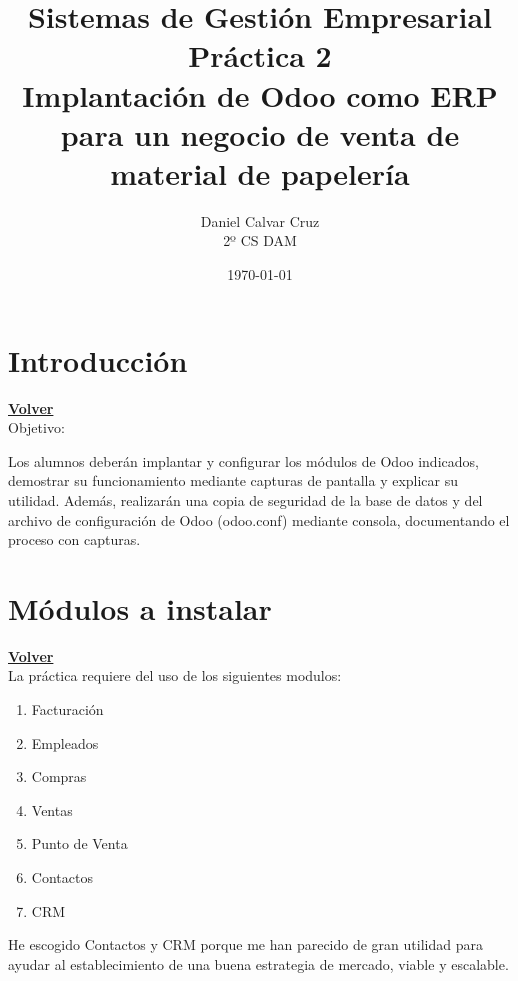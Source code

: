 \documentclass[a4paper,12pt]{article}
\title{
    \vspace{2cm}
    {\Huge\textbf{Sistemas de Gestión Empresarial}}\\[1em]
    {\Large\textbf{Práctica 2}}\\[1em]
    {\Large Implantación de Odoo como ERP para un negocio de venta de material de papelería}
    \vspace{1.5cm}
}
\author{\Large Daniel Calvar Cruz\\[0.5em]\normalsize 2º CS DAM}
\date{\vspace{1cm}\today}
\begin{document}
\maketitle
\clearpage
\hypertarget{anchor-indice}{}
\tableofcontents
\newpage

\section{Introducción}
\hyperlink{anchor-indice}{\textbf{Volver}}\\

Objetivo:

Los alumnos deberán implantar y configurar los módulos de Odoo indicados,
demostrar su funcionamiento mediante capturas de pantalla y explicar su utilidad.
Además, realizarán una copia de seguridad de la base de datos y del archivo de
configuración de Odoo (odoo.conf) mediante consola, documentando el proceso con
capturas.


\section{Módulos a instalar}
\hyperlink{anchor-indice}{\textbf{Volver}}\\

La práctica requiere del uso de los siguientes modulos: 
\begin{enumerate}
    \item Facturación
    \item Empleados
    \item Compras
    \item Ventas
    \item Punto de Venta
    \item Contactos
    \item CRM
\end{enumerate}

He escogido Contactos y CRM porque me han parecido de gran utilidad para ayudar al establecimiento de una buena estrategia de mercado, viable y escalable.
\end{document}
